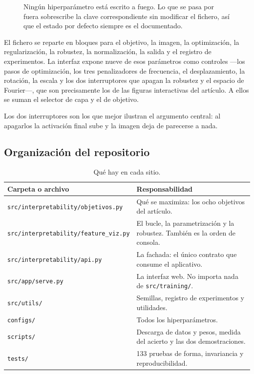 \documentclass[11pt,a4paper]{article}
\begin{document}
\begin{figure}[htb]
\centering
{}
\caption{Ningún hiperparámetro está escrito a fuego. Lo que se pasa por
fuera sobrescribe la clave correspondiente sin modificar el fichero, así que
el estado por defecto siempre es el documentado.}
\label{fig:config}
\end{figure}

El fichero se reparte en bloques para el objetivo, la imagen, la
optimización, la regularización, la robustez, la normalización, la salida y
el registro de experimentos. La interfaz expone nueve de esos parámetros
como controles —los pasos de optimización, los tres penalizadores de
frecuencia, el desplazamiento, la rotación, la escala y los dos
interruptores que apagan la robustez y el espacio de Fourier—, que son
precisamente los de las figuras interactivas del artículo. A ellos se suman
el selector de capa y el de objetivo.

Los dos interruptores son los que mejor ilustran el argumento central: al
apagarlos la activación final sube y la imagen deja de parecerse a nada.

\subsection{Organización del repositorio}

\begin{table}[htb]
\centering\small
\caption{Qué hay en cada sitio.}
\begin{tabular}{l L{10.8cm}}
\toprule
\textbf{Carpeta o archivo} & \textbf{Responsabilidad} \\
\midrule
\texttt{src/interpretability/objetivos.py} & Qué se maximiza: los ocho
objetivos del artículo. \\
\texttt{src/interpretability/feature\_viz.py} & El bucle, la parametrización
y la robustez. También es la orden de consola. \\
\texttt{src/interpretability/api.py} & La fachada: el único contrato que
consume el aplicativo. \\
\texttt{src/app/serve.py} & La interfaz web. No importa nada de
\texttt{src/training/}. \\
\texttt{src/utils/} & Semillas, registro de experimentos y utilidades. \\
\texttt{configs/} & Todos los hiperparámetros. \\
\texttt{scripts/} & Descarga de datos y pesos, medida del acierto y las dos
demostraciones. \\
\texttt{tests/} & 133 pruebas de forma, invariancia y reproducibilidad. \\
\bottomrule
\end{tabular}
\end{table}
\end{document}
